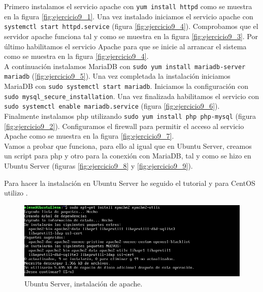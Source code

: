 \begin{enumerate}
Primero instalamos el servicio apache con \texttt{yum install httpd} como se muestra en la figura \ref{fig:ejercicio9_1}. Una vez instalado iniciamos el servicio apache con \texttt{systemctl start httpd.service} (figura \ref{fig:ejercicio9_4}). Comprobamos que el servidor apache funciona tal y como se muestra en la figura \ref{fig:ejercicio9_3}. Por último habilitamos el servicio Apache para que se inicie al arrancar el sistema como se muestra en la figura \ref{fig:ejercicio9_4}.\\
A continuación instalamos MariaDB con \texttt{sudo yum install mariadb-server mariadb} (\ref{fig:ejercicio9_5}). Una vez completada la instalación iniciamos MariaDB con \texttt{sudo systemctl start mariadb}. Iniciamos la configuración con \texttt{sudo mysql\_secure\_installation}. Una vez finalizada habilitamos el servicio con \texttt{sudo systemctl enable mariadb.service} (figura \ref{fig:ejercicio9_6}).\\
Finalmente instalamos php utilizando \texttt{sudo yum install php php-mysql} (figura \ref{fig:ejercicio9_2}). Configuramos el firewall para permitir el acceso al servicio Apache como se muestra en la figura \ref{fig:ejercicio9_7}.\\
Vamos a probar que funciona, para ello al igual que en Ubuntu Server, creamos un script para php y otro para la conexión con MariaDB, tal y como se hizo en Ubuntu Server (figuras \ref{fig:ejercicio9_8} y \ref{fig:ejercicio9_9}).

\end{enumerate}


Para hacer la instalación en Ubuntu Server he seguido el tutorial \cite{LAMP} y para CentOS utilizo \cite{LAMPCentOS}.

\begin{figure}[H] 
	\centering
	\includegraphics[width=15cm]{./img/ejercicio9a.png} 	
	\caption{Ubuntu Server, instalación de apache.} \label{fig:ejercicio9a}
\end{figure}


